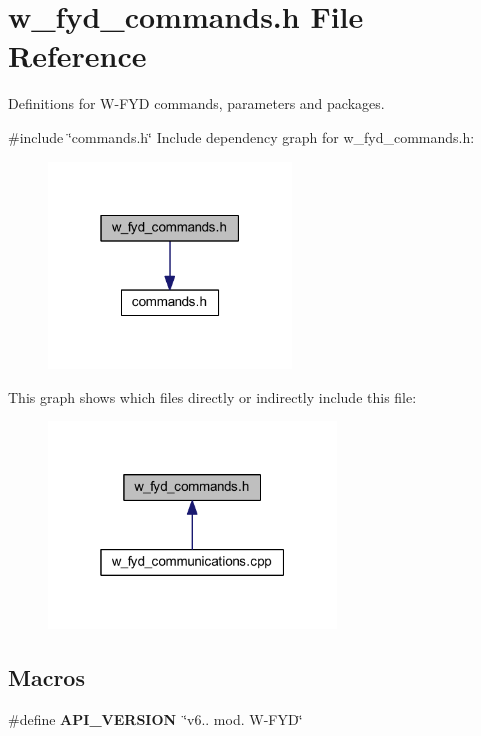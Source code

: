\section{w\+\_\+fyd\+\_\+commands.\+h File Reference}
\label{w__fyd__commands_8h}


Definitions for W-\/\+F\+YD commands, parameters and packages.  


{\ttfamily \#include \char`\"{}commands.\+h\char`\"{}}\newline
Include dependency graph for w\+\_\+fyd\+\_\+commands.\+h\+:
\nopagebreak
\begin{figure}[H]
\begin{center}
\leavevmode
\includegraphics[width=183pt]{w__fyd__commands_8h__incl}
\end{center}
\end{figure}
This graph shows which files directly or indirectly include this file\+:
\nopagebreak
\begin{figure}[H]
\begin{center}
\leavevmode
\includegraphics[width=217pt]{w__fyd__commands_8h__dep__incl}
\end{center}
\end{figure}
\subsection*{Macros}
\begin{DoxyCompactItemize}
\item 
\mbox{\label{w__fyd__commands_8h_ad97188edfdd667de971027b35330fa41}} 
\#define {\bfseries A\+P\+I\+\_\+\+V\+E\+R\+S\+I\+ON}~\char`\"{}v6.. mod. W-\/F\+YD\char`\"{}
\end{DoxyCompactItemize}
